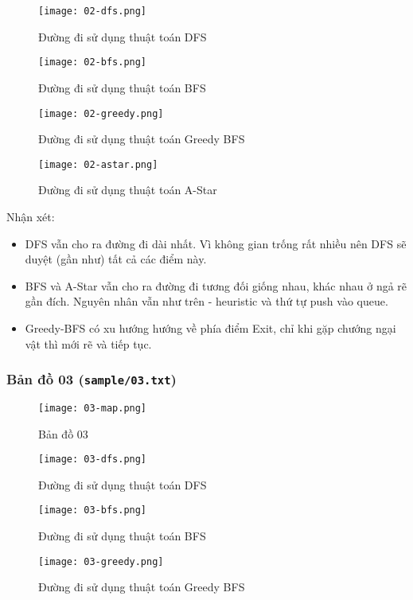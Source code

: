 \documentclass{article}
\begin{document}
\begin{figure}[H]
	\centering
	\texttt{[image: 02-dfs.png]}
	\caption{Đường đi sử dụng thuật toán DFS}
\end{figure}

\begin{figure}[H]
	\centering
	\texttt{[image: 02-bfs.png]}
	\caption{Đường đi sử dụng thuật toán BFS}
\end{figure}

\begin{figure}[H]
	\centering
	\texttt{[image: 02-greedy.png]}
	\caption{Đường đi sử dụng thuật toán Greedy BFS}
\end{figure}

\begin{figure}[H]
	\centering
	\texttt{[image: 02-astar.png]}
	\caption{Đường đi sử dụng thuật toán A-Star}
\end{figure}

Nhận xét:
\begin{itemize}
\item DFS vẫn cho ra đường đi dài nhất. Vì không gian trống rất nhiều nên DFS sẽ duyệt (gần như) tất cả các điểm này.
\item BFS và A-Star vẫn cho ra đường đi tương đối giống nhau, khác nhau ở ngả rẽ gần đích. Nguyên nhân vẫn như trên - heuristic và thứ tự push vào queue.
\item Greedy-BFS có xu hướng hướng về phía điểm Exit, chỉ khi gặp chướng ngại vật thì mới rẽ và tiếp tục.
\end{itemize}

\subsubsection{Bản đồ 03 (\texttt{sample/03.txt})}
\begin{figure}[H]
	\centering
	\texttt{[image: 03-map.png]}
	\caption{Bản đồ 03}
\end{figure}

\begin{figure}[H]
	\centering
	\texttt{[image: 03-dfs.png]}
	\caption{Đường đi sử dụng thuật toán DFS}
\end{figure}

\begin{figure}[H]
	\centering
	\texttt{[image: 03-bfs.png]}
	\caption{Đường đi sử dụng thuật toán BFS}
\end{figure}

\begin{figure}[H]
	\centering
	\texttt{[image: 03-greedy.png]}
	\caption{Đường đi sử dụng thuật toán Greedy BFS}
\end{figure}
\end{document}
